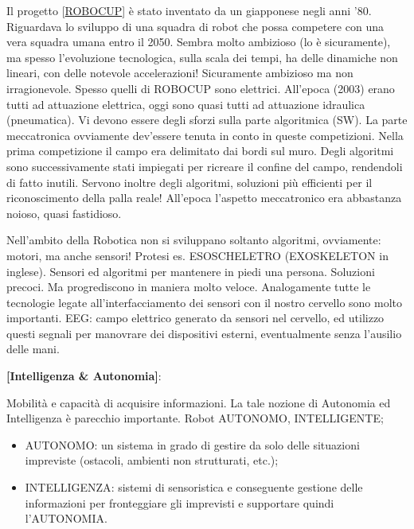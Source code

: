 Il progetto [\underline{ROBOCUP}] è stato inventato da un giapponese negli anni '80. Riguardava lo sviluppo di una squadra di robot che possa competere con una vera squadra umana entro il 2050. Sembra molto ambizioso (lo è sicuramente), ma spesso l'evoluzione tecnologica, sulla scala dei tempi, ha delle dinamiche non lineari, con delle notevole accelerazioni! Sicuramente ambizioso ma non irragionevole. Spesso quelli di ROBOCUP sono elettrici. All'epoca (2003) erano tutti ad attuazione elettrica, oggi sono quasi tutti ad attuazione idraulica (pneumatica). Vi devono essere degli sforzi sulla parte algoritmica (SW). La parte meccatronica ovviamente dev'essere tenuta in conto in queste competizioni. Nella prima competizione il campo era delimitato dai bordi sul muro. Degli algoritmi sono successivamente stati impiegati per ricreare il confine del campo, rendendoli di fatto inutili. Servono inoltre degli algoritmi, soluzioni più efficienti per il riconoscimento della palla reale! All'epoca l'aspetto meccatronico era abbastanza noioso, quasi fastidioso.

Nell'ambito della Robotica non si sviluppano soltanto algoritmi, ovviamente: motori, ma anche sensori! Protesi es. ESOSCHELETRO (EXOSKELETON in inglese). Sensori ed algoritmi per mantenere in piedi una persona. Soluzioni precoci. Ma progrediscono in maniera molto veloce. Analogamente tutte le tecnologie legate all'interfacciamento dei sensori con il nostro cervello sono molto importanti. EEG: campo elettrico generato da sensori nel cervello, ed utilizzo questi segnali per manovrare dei dispositivi esterni, eventualmente senza l'ausilio delle mani.

\begin{defn}{\textbf{[Intelligenza \& Autonomia]}}:

Mobilità e capacità di acquisire informazioni. La tale nozione di Autonomia ed Intelligenza è parecchio importante. Robot AUTONOMO, INTELLIGENTE;

\begin{itemize}

\item{AUTONOMO}: un sistema in grado di gestire da solo delle situazioni impreviste (ostacoli, ambienti non strutturati, etc.);
\item{INTELLIGENZA}: sistemi di sensoristica e conseguente gestione delle informazioni per fronteggiare gli imprevisti e supportare quindi l'AUTONOMIA.

\end{itemize}

\end{defn}

